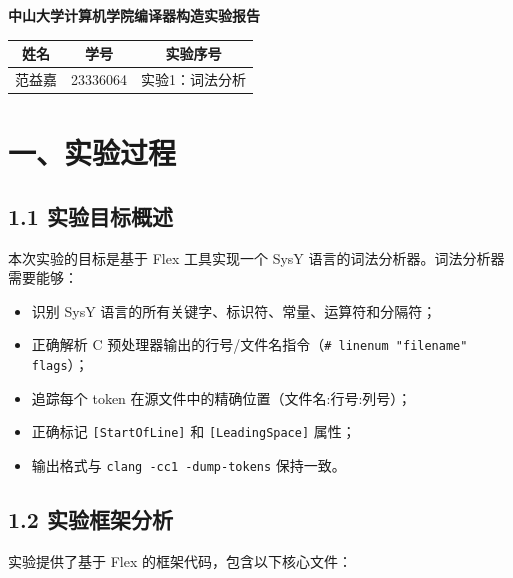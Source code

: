 \documentclass[12pt,a4paper]{article}
\begin{document}
\begin{center}
    {\LARGE\bfseries 中山大学计算机学院编译器构造实验报告}
    \vspace{1em}

    \begin{tabular}{|c|c|c|}
        \hline
        \textbf{姓名} & \textbf{学号} & \textbf{实验序号} \\
        \hline
        范益嘉 & 23336064 & 实验1：词法分析 \\
        \hline
    \end{tabular}
\end{center}

\vspace{1em}

\section{一、实验过程}

\subsection{1.1 实验目标概述}

本次实验的目标是基于 Flex 工具实现一个 SysY 语言的词法分析器。词法分析器需要能够：
\begin{itemize}[leftmargin=2em]
    \item 识别 SysY 语言的所有关键字、标识符、常量、运算符和分隔符；
    \item 正确解析 C 预处理器输出的行号/文件名指令（\texttt{\# linenum "filename" flags}）；
    \item 追踪每个 token 在源文件中的精确位置（文件名:行号:列号）；
    \item 正确标记 \texttt{[StartOfLine]} 和 \texttt{[LeadingSpace]} 属性；
    \item 输出格式与 \texttt{clang -cc1 -dump-tokens} 保持一致。
\end{itemize}

\subsection{1.2 实验框架分析}

实验提供了基于 Flex 的框架代码，包含以下核心文件：
\end{document}
